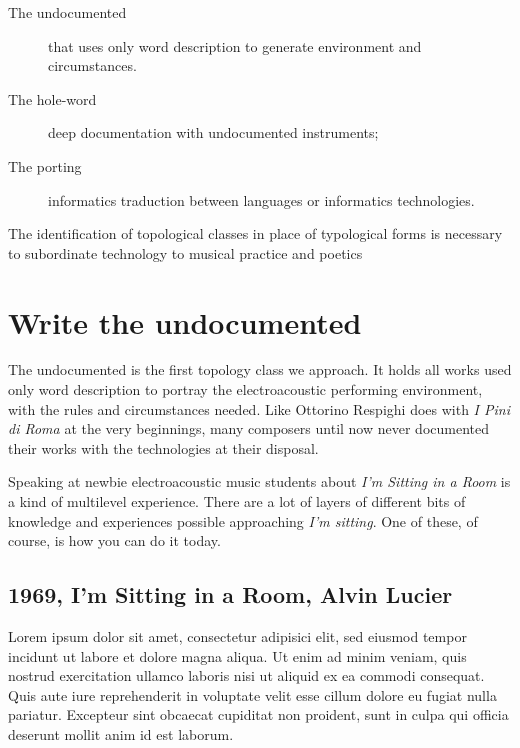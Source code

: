\documentclass[twoside,a4paper]{article}
\begin{document}
\begin{description}
  \item[The undocumented] that uses only word description to generate environment and circumstances.
  \item[The hole-word] deep documentation with undocumented instruments;
  \item[The porting] informatics traduction between languages or informatics technologies.
\end{description}

The identification of topological classes in place of typological forms is necessary to subordinate technology to musical practice and poetics


\section{Write the undocumented}
\label{sec:writing}

The undocumented is the first topology class we approach. It holds all works used only word description to portray the electroacoustic performing environment, with the rules and circumstances needed. Like Ottorino Respighi does with \emph{I Pini di Roma} at the very beginnings, many composers until now never documented their works with the technologies at their disposal. 

Speaking at newbie electroacoustic music students about \emph{I'm Sitting in a Room} is a kind of multilevel experience. There are a lot of layers of different bits of knowledge and experiences possible approaching \emph{I'm sitting}. One of these, of course, is how you can do it today. 

\subsection{1969, I'm Sitting in a Room, Alvin Lucier}

Lorem ipsum dolor sit amet, consectetur adipisici elit, sed eiusmod tempor
incidunt ut labore et dolore magna aliqua. Ut enim ad minim veniam, quis
nostrud exercitation ullamco laboris nisi ut aliquid ex ea commodi consequat.
Quis aute iure reprehenderit in voluptate velit esse cillum dolore eu fugiat
nulla pariatur. Excepteur sint obcaecat cupiditat non proident, sunt in culpa
qui officia deserunt mollit anim id est laborum.
\end{document}
